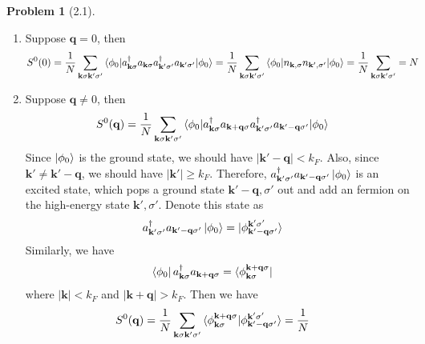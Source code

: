 \documentclass[twoside,11pt]{article}
\theoremstyle{definition}
\newtheorem{problem}{Problem}
\theoremstyle{remark}
\begin{document}
\begin{problem}[2.1]\
\begin{enumerate}[label=(\alph*)]
\item Suppose $\mathbf{q}=0$, then
\begin{align*}
    S^0(0) &= 
    \frac{1}{N}
    \sum_{\mathbf{k}\sigma\mathbf{k}'\sigma'}
    \braket{\phi_0|
    a_{\mathbf{k}\sigma}^\dagger a_{\mathbf{k}\sigma}
    a_{\mathbf{k}'\sigma'}^\dagger a_{\mathbf{k}'\sigma'}
    |\phi_0}
    = 
    \frac{1}{N}
    \sum_{\mathbf{k}\sigma\mathbf{k}'\sigma'}
    \braket{\phi_0|
    n_{\mathbf{k},\sigma}n_{\mathbf{k}',\sigma'}
    |\phi_0}
    =
    \frac{1}{N}
    \sum_{\mathbf{k}\sigma\mathbf{k}'\sigma'}
    = N
\end{align*}

\item Suppose $\mathbf{q}\neq 0$, then
\begin{align*}
    S^0(\mathbf{q}) &=
    \frac{1}{N}
    \sum_{\mathbf{k}\sigma\mathbf{k}'\sigma'}
    \braket{\phi_0|
    a_{\mathbf{k}\sigma}^\dagger a_{\mathbf{k}+\mathbf{q}\sigma}
    a_{\mathbf{k}'\sigma'}^\dagger a_{\mathbf{k}'-\mathbf{q}\sigma'}
    |\phi_0}
\end{align*}
Since $\ket{\phi_0}$ is the ground state, we should have $|\mathbf{k}'-\mathbf{q}|<k_F$.
Also, since $\mathbf{k}'\neq\mathbf{k}'-\mathbf{q}$, we should have
$|\mathbf{k}'|\geq k_F$.
Therefore, $a_{\mathbf{k}'\sigma'}^\dagger a_{\mathbf{k}'-\mathbf{q}\sigma'}\ket{\phi_0}$
is an excited state, which pops a ground state $\mathbf{k}'-\mathbf{q},\sigma'$ out
and add an fermion on the high-energy state $\mathbf{k}',\sigma'$.
Denote this state as
\begin{align*}
    a^\dagger_{\mathbf{k}'\sigma'}
    a_{\mathbf{k}'-\mathbf{q}\sigma'}\ket{\phi_0} &=
    \ket{\phi_{\mathbf{k'}-\mathbf{q}\sigma'}^{\mathbf{k}'\sigma'}}
\end{align*}
Similarly, we have
\begin{align*}
    \bra{\phi_0}a_{\mathbf{k}\sigma}^\dagger
    a_{\mathbf{k}+\mathbf{q}\sigma}
    &= 
    \bra{\phi_{\mathbf{k}\sigma}^{\mathbf{k}+\mathbf{q}\sigma}}
\end{align*}
where $|\mathbf{k}|<k_F$ and $|\mathbf{k}+\mathbf{q}|>k_F$.
Then we have
\begin{align*}
    S^0(\mathbf{q}) &= 
    \frac{1}{N}
    \sum_{\mathbf{k}\sigma\mathbf{k}'\sigma'}
    \braket{\phi_{\mathbf{k}\sigma}^{\mathbf{k}+\mathbf{q}\sigma}|
    \phi_{\mathbf{k'}-\mathbf{q}\sigma'}^{\mathbf{k}'\sigma'}}
    =
    \frac{1}{N}

\end{align*}
\end{enumerate}
\end{problem}
\end{document}
